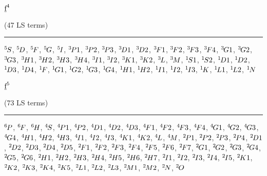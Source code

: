 \begin{mdframed}
\begin{center}
$\underbar{$\text{f}$}^{4}$

(47 LS terms)
\vspace{0.25cm}
\hrule
\vspace{0.25cm}

${}^{5}{\kern-0.1em}{S}$, ${}^{5}{\kern-0.1em}{D}$, ${}^{5}{\kern-0.1em}{F}$, ${}^{5}{\kern-0.1em}{G}$, ${}^{5}{\kern-0.1em}{I}$, ${}^{3}{\kern-0.1em}{P1}$, ${}^{3}{\kern-0.1em}{P2}$, ${}^{3}{\kern-0.1em}{P3}$, ${}^{3}{\kern-0.1em}{D1}$, ${}^{3}{\kern-0.1em}{D2}$, ${}^{3}{\kern-0.1em}{F1}$, ${}^{3}{\kern-0.1em}{F2}$, ${}^{3}{\kern-0.1em}{F3}$, ${}^{3}{\kern-0.1em}{F4}$, ${}^{3}{\kern-0.1em}{G1}$, ${}^{3}{\kern-0.1em}{G2}$, ${}^{3}{\kern-0.1em}{G3}$, ${}^{3}{\kern-0.1em}{H1}$, ${}^{3}{\kern-0.1em}{H2}$, ${}^{3}{\kern-0.1em}{H3}$, ${}^{3}{\kern-0.1em}{H4}$, ${}^{3}{\kern-0.1em}{I1}$, ${}^{3}{\kern-0.1em}{I2}$, ${}^{3}{\kern-0.1em}{K1}$, ${}^{3}{\kern-0.1em}{K2}$, ${}^{3}{\kern-0.1em}{L}$, ${}^{3}{\kern-0.1em}{M}$, ${}^{1}{\kern-0.1em}{S1}$, ${}^{1}{\kern-0.1em}{S2}$, ${}^{1}{\kern-0.1em}{D1}$, ${}^{1}{\kern-0.1em}{D2}$, ${}^{1}{\kern-0.1em}{D3}$, ${}^{1}{\kern-0.1em}{D4}$, ${}^{1}{\kern-0.1em}{F}$, ${}^{1}{\kern-0.1em}{G1}$, ${}^{1}{\kern-0.1em}{G2}$, ${}^{1}{\kern-0.1em}{G3}$, ${}^{1}{\kern-0.1em}{G4}$, ${}^{1}{\kern-0.1em}{H1}$, ${}^{1}{\kern-0.1em}{H2}$, ${}^{1}{\kern-0.1em}{I1}$, ${}^{1}{\kern-0.1em}{I2}$, ${}^{1}{\kern-0.1em}{I3}$, ${}^{1}{\kern-0.1em}{K}$, ${}^{1}{\kern-0.1em}{L1}$, ${}^{1}{\kern-0.1em}{L2}$, ${}^{1}{\kern-0.1em}{N}$
\end{center}
\end{mdframed}

\begin{mdframed}
\begin{center}
$\underbar{$\text{f}$}^{5}$

(73 LS terms)
\vspace{0.25cm}
\hrule
\vspace{0.25cm}

${}^{6}{\kern-0.1em}{P}$, ${}^{6}{\kern-0.1em}{F}$, ${}^{6}{\kern-0.1em}{H}$, ${}^{4}{\kern-0.1em}{S}$, ${}^{4}{\kern-0.1em}{P1}$, ${}^{4}{\kern-0.1em}{P2}$, ${}^{4}{\kern-0.1em}{D1}$, ${}^{4}{\kern-0.1em}{D2}$, ${}^{4}{\kern-0.1em}{D3}$, ${}^{4}{\kern-0.1em}{F1}$, ${}^{4}{\kern-0.1em}{F2}$, ${}^{4}{\kern-0.1em}{F3}$, ${}^{4}{\kern-0.1em}{F4}$, ${}^{4}{\kern-0.1em}{G1}$, ${}^{4}{\kern-0.1em}{G2}$, ${}^{4}{\kern-0.1em}{G3}$, ${}^{4}{\kern-0.1em}{G4}$, ${}^{4}{\kern-0.1em}{H1}$, ${}^{4}{\kern-0.1em}{H2}$, ${}^{4}{\kern-0.1em}{H3}$, ${}^{4}{\kern-0.1em}{I1}$, ${}^{4}{\kern-0.1em}{I2}$, ${}^{4}{\kern-0.1em}{I3}$, ${}^{4}{\kern-0.1em}{K1}$, ${}^{4}{\kern-0.1em}{K2}$, ${}^{4}{\kern-0.1em}{L}$, ${}^{4}{\kern-0.1em}{M}$, ${}^{2}{\kern-0.1em}{P1}$, ${}^{2}{\kern-0.1em}{P2}$, ${}^{2}{\kern-0.1em}{P3}$, ${}^{2}{\kern-0.1em}{P4}$, ${}^{2}{\kern-0.1em}{D1}$, ${}^{2}{\kern-0.1em}{D2}$, ${}^{2}{\kern-0.1em}{D3}$, ${}^{2}{\kern-0.1em}{D4}$, ${}^{2}{\kern-0.1em}{D5}$, ${}^{2}{\kern-0.1em}{F1}$, ${}^{2}{\kern-0.1em}{F2}$, ${}^{2}{\kern-0.1em}{F3}$, ${}^{2}{\kern-0.1em}{F4}$, ${}^{2}{\kern-0.1em}{F5}$, ${}^{2}{\kern-0.1em}{F6}$, ${}^{2}{\kern-0.1em}{F7}$, ${}^{2}{\kern-0.1em}{G1}$, ${}^{2}{\kern-0.1em}{G2}$, ${}^{2}{\kern-0.1em}{G3}$, ${}^{2}{\kern-0.1em}{G4}$, ${}^{2}{\kern-0.1em}{G5}$, ${}^{2}{\kern-0.1em}{G6}$, ${}^{2}{\kern-0.1em}{H1}$, ${}^{2}{\kern-0.1em}{H2}$, ${}^{2}{\kern-0.1em}{H3}$, ${}^{2}{\kern-0.1em}{H4}$, ${}^{2}{\kern-0.1em}{H5}$, ${}^{2}{\kern-0.1em}{H6}$, ${}^{2}{\kern-0.1em}{H7}$, ${}^{2}{\kern-0.1em}{I1}$, ${}^{2}{\kern-0.1em}{I2}$, ${}^{2}{\kern-0.1em}{I3}$, ${}^{2}{\kern-0.1em}{I4}$, ${}^{2}{\kern-0.1em}{I5}$, ${}^{2}{\kern-0.1em}{K1}$, ${}^{2}{\kern-0.1em}{K2}$, ${}^{2}{\kern-0.1em}{K3}$, ${}^{2}{\kern-0.1em}{K4}$, ${}^{2}{\kern-0.1em}{K5}$, ${}^{2}{\kern-0.1em}{L1}$, ${}^{2}{\kern-0.1em}{L2}$, ${}^{2}{\kern-0.1em}{L3}$, ${}^{2}{\kern-0.1em}{M1}$, ${}^{2}{\kern-0.1em}{M2}$, ${}^{2}{\kern-0.1em}{N}$, ${}^{2}{\kern-0.1em}{O}$
\end{center}
\end{mdframed}

